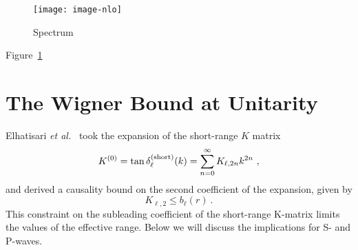 \documentclass[aps,preprint,superscriptaddress]{revtex4-1}
\begin{document}
\begin{figure}[t]
\begin{center}
\texttt{[image: image-nlo]} 
\end{center}
\caption{Spectrum}
\label{fig:bs-spectrum-nlo}
\end{figure}

Figure~\ref{fig:bs-spectrum-nlo}

\section{The Wigner Bound at Unitarity}
\label{sec:wigner-bound-at-unitarity}
Elhatisari {\it et al.}~\cite{Elhatisari:2013swa} took the expansion
of the short-range $K$ matrix
\begin{equation}
  \label{eq:K_expansion}
  K^{(0)} = \tan\delta_{\ell}^{({\rm short})}(k) = \sum_{n=0}^\infty
  K_{\ell,2n}k^{2n}~,
\end{equation}
and derived a causality bound on the second coefficient of the expansion, given
by
\begin{equation}
  K_{\ell,2} \le b_{\ell}(r)~.
\end{equation}
This constraint on the subleading coefficient of the short-range
K-matrix limits the values of the effective range. Below we will
discuss the implications for S- and P-waves.
\end{document}
